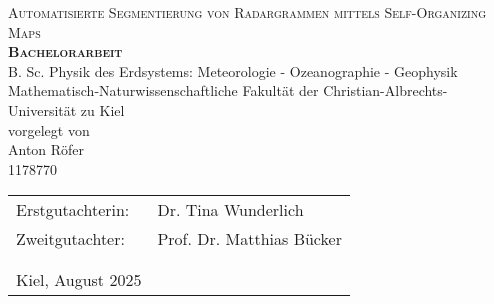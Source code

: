 \begin{titlepage}
	\begin{center}
		\huge \textsc{Automatisierte Segmentierung von Radargrammen mittels Self-Organizing Maps} \\
		\vspace{2cm}
		\LARGE\textbf{\textsc{Bachelorarbeit}}\\
		\vspace{2cm}
		{\large B. Sc. Physik des Erdsystems: Meteorologie - Ozeanographie - Geophysik \\
		Mathematisch-Naturwissenschaftliche Fakultät der Christian-Albrechts-Universität zu Kiel \\
		\vspace{2.5cm}
		vorgelegt von \\
		Anton Röfer \\
		1178770 \\}
		\vspace{4cm}
	\end{center}
	\normalsize{
		\begin{tabular}{ll}
			Erstgutachterin: & {Dr. Tina Wunderlich} \\
			Zweitgutachter: & {Prof. Dr. Matthias Bücker} \\
			& \\
			& \\
			Kiel, August 2025 & \\
		\end{tabular}\\
	}
\end{titlepage}